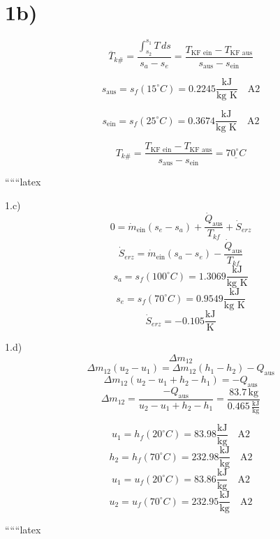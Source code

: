 

\section*{1b)}

\[
\overline{T}_{k\#} = \frac{\int_{s_2}^{s_1} T \, ds}{s_a - s_e} = \frac{T_{\text{KF ein}} - T_{\text{KF aus}}}{s_{\text{aus}} - s_{\text{ein}}}
\]

\[
s_{\text{aus}} = s_f(15^\circ C) = 0.2245 \frac{\text{kJ}}{\text{kg K}} \quad \text{A2}
\]

\[
s_{\text{ein}} = s_f(25^\circ C) = 0.3674 \frac{\text{kJ}}{\text{kg K}} \quad \text{A2}
\]

\[
T_{k\#} = \frac{T_{\text{KF ein}} - T_{\text{KF aus}}}{s_{\text{aus}} - s_{\text{ein}}} = \underline{70^\circ C}
\]

``````latex


1.c)
\[
0 = \dot{m}_{\text{ein}} (s_e - s_a) + \frac{\dot{Q}_{\text{aus}}}{T_{kf}} + \dot{S}_{erz}
\]
\[
\dot{S}_{erz} = \dot{m}_{\text{ein}} (s_a - s_e) - \frac{\dot{Q}_{\text{aus}}}{T_{kf}}
\]
\[
s_a = s_f (100^\circ C) = 1.3069 \frac{\text{kJ}}{\text{kg K}}
\]
\[
s_e = s_f (70^\circ C) = 0.9549 \frac{\text{kJ}}{\text{kg K}}
\]
\[
\dot{S}_{erz} = -0.105 \frac{\text{kJ}}{\text{K}}
\]

1.d)
\[
\Delta m_{12}
\]
\[
\Delta m_{12} (u_2 - u_1) = \Delta m_{12} (h_1 - h_2) - Q_{\text{aus}}
\]
\[
\Delta m_{12} \left( u_2 - u_1 + h_2 - h_1 \right) = -Q_{\text{aus}}
\]
\[
\Delta m_{12} = \frac{-Q_{\text{aus}}}{u_2 - u_1 + h_2 - h_1} = \frac{83.7 \, \text{kg}}{0.465 \, \frac{\text{kJ}}{\text{kg}}}
\]

\[
u_1 = h_f (20^\circ C) = 83.98 \frac{\text{kJ}}{\text{kg}} \quad \text{A2}
\]
\[
h_2 = h_f (70^\circ C) = 232.98 \frac{\text{kJ}}{\text{kg}} \quad \text{A2}
\]
\[
u_1 = u_f (20^\circ C) = 83.86 \frac{\text{kJ}}{\text{kg}} \quad \text{A2}
\]
\[
u_2 = u_f (70^\circ C) = 232.95 \frac{\text{kJ}}{\text{kg}} \quad \text{A2}
\]

``````latex